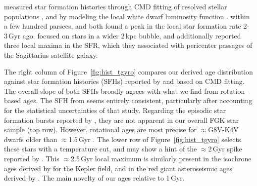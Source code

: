 \documentclass[11pt,twocolumn,tighten]{aastex63}
\begin{document}
 measured star formation histories
through CMD fitting of resolved stellar populations
\citep[][]{2019A&A...624L...1M,2020NatAs...4..965R,2021MNRAS.501..302A,2022Natur.603..599X},
and by modeling the local white dwarf luminosity function
\citep[e.g.][]{2019ApJ...878L..11I}.  \citet{2019A&A...624L...1M}  within a few hundred parsecs, and both found a peak in the
local star formation rate 2-3\,Gyr ago.  \citet{2020NatAs...4..965R}
focused on stars in a wider 2\,kpc bubble, and additionally reported
three local maxima in the SFR, which they
associated with pericenter passages of the Sagittarius satellite
galaxy.

The right column of Figure~\ref{fig:hist_tgyro} compares our derived
age distribution against star formation histories (SFHs) reported by
\citet{2019A&A...624L...1M} and \citet{2020NatAs...4..965R} based on
CMD fitting.  The overall slope of both SFHs broadly agrees with what
we find from rotation-based ages.  The SFH from
\citet{2019A&A...624L...1M} seems entirely consistent, particularly
after accounting for the statistical uncertainties of that study.
Regarding the episodic star formation bursts reported by
\citet{2020NatAs...4..965R}, they are not apparent in our overall FGK
star sample (top row).  However, rotational ages are most precise
for $\approx$G8V-K4V dwarfs older than $\approx$1.5\,Gyr
\citep{Bouma_2023}.  The lower row of Figure~\ref{fig:hist_tgyro}
selects these stars with a temperature cut, and may show a hint of the
$\approx$2\,Gyr spike reported by \citet{2020NatAs...4..965R}.   This
$\approx$2.5\,Gyr local maximum is similarly present in the isochrone
ages derived by \citet{Berger_2020a_catalog} for the Kepler field, and
in the red giant asteroseismic ages derived by
\citet{SilvaAguirre2018}.  The main novelty of our ages relative to
 1\,Gyr.
\end{document}
